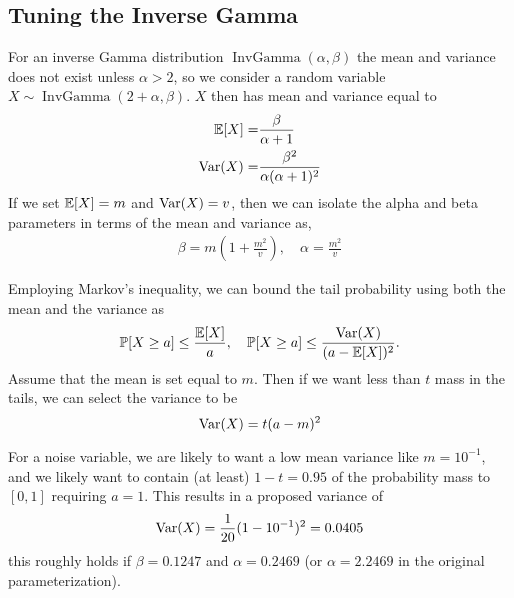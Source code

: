 \documentclass{article}
\begin{document}
\subsection{Tuning the Inverse Gamma}
For an inverse Gamma distribution $\operatorname{InvGamma}(\alpha,\beta)$ the mean and variance does not exist unless $\alpha>2$, so we consider a random variable $X\sim\operatorname{InvGamma}(2+\alpha,\beta)$. $X$ then has mean and variance equal to 
\begin{align}
\operatorname{\mathbb{E}}\!{\left[X\right]}=&\frac{\beta}{\alpha+1}\\
\operatorname{\mathrm{Var}}\!{\left(X\right)}=&\frac{\beta^2}{\alpha(\alpha+1)^2}
\end{align}
If we set $\operatorname{\mathbb{E}}\!{\left[X\right]}=m$ and $\operatorname{\mathrm{Var}}\!{\left(X\right)}=v$, then we can isolate the alpha and beta parameters in terms of the mean and variance as,
\begin{align}
\beta=m\left(1+\frac{m^2}{v}\right),\quad 
\alpha=\frac{m^2}{v}
\end{align}



Employing Markov's inequality, we can bound the tail probability using both the mean and the variance as 
\begin{equation}
\mathbb{P}[X\geq a]\leq \frac{\operatorname{\mathbb{E}}\!{\left[X\right]}}{a},\quad \mathbb{P}[X\geq a]\leq \frac{\operatorname{\mathrm{Var}}\!{\left(X\right)}}{(a-\operatorname{\mathbb{E}}\!{\left[X\right]})^2}.
\end{equation}
Assume that the mean is set equal to $m$. Then if we want less than $t$ mass in the tails, we can select the variance to be
\begin{equation}
\operatorname{\mathrm{Var}}\!{\left(X\right)}=t(a-m)^2
\end{equation}

For a noise variable, we are likely to want a low mean variance like $m=10^{-1}$, and we likely want to contain (at least) $1-t=0.95$ of the probability mass to $[0,1]$ requiring $a=1$. This results in a proposed variance of 
\begin{equation}
\operatorname{\mathrm{Var}}\!{\left(X\right)}=\frac{1}{20}(1-10^{-1})^2=0.0405
\end{equation} 
this roughly holds if $\beta=0.1247$ and $\alpha=0.2469$ (or $\alpha=2.2469$ in the original parameterization).
\end{document}
